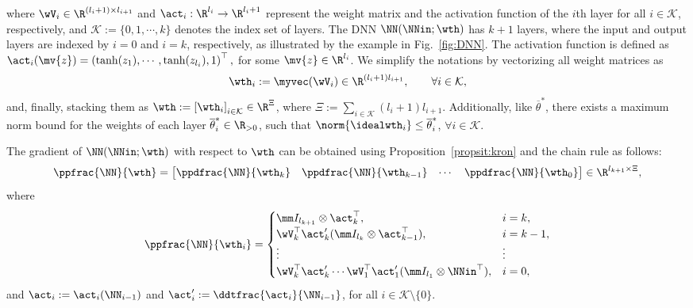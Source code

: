 \documentclass[letterpaper, journal]{IEEEtran}
\begin{document}
where $\wV_i\in\R^{(l_i+1)\times l_{i+1}}$ and $\act_i: \R^{l_i}\to\R^{l_i+1}$ represent the weight matrix and the activation function of the $i$th layer for all $i\in\mathcal{K}$, respectively, and $\mathcal{K}:=\{0,1,\cdots,k\}$ denotes the index set of layers.
The DNN $\NN(\NNin;\wth)$ has $k+1$ layers, where the input and output layers are indexed by $i=0$ and $i=k$, respectively, as illustrated by the example in Fig.~\ref{fig:DNN}.
The activation function is defined as $\act_i(\mv{z}) = \left(\tanh(z_1),\cdots,\tanh(z_{l_i}),1\right)^\top,$ for some $\mv{z}\in\R^{l_i}$.
We simplify the notations by vectorizing all weight matrices as 
\begin{equation*}
  \wth_i 
  :=
  \myvec(\wV_i)
  \in\R^{(l_i+1)l_{i+1}}
  ,
  \qquad
  \forall 
  i\in\mathcal{K}
  ,
\end{equation*}
and, finally, stacking them as $\wth := \left[\wth_i\right]_{i\in\mathcal{K}}\in\R^\Xi$, where $\Xi := \sum_{i\in\mathcal{K}} (l_i+1)l_{i+1}$.
Additionally, like $\overline{\theta}^*$, there exists a maximum norm bound for the weights of each layer $\overline{\theta}^*_i\in\R_{>0}$, such that $\norm{\idealwth_i}\le\overline{\theta}^*_i$, $\forall i\in\mathcal{K}$.

The gradient of $ \NN(\NNin;\wth)$ with respect to $\wth$ can be obtained using Proposition~\ref{propsit:kron} and the chain rule as follows:
\begin{equation}
  \ppfrac{\NN}{\wth}=
  \begin{bmatrix}
    \ppdfrac{\NN}{\wth_k}&
    \ppdfrac{\NN}{\wth_{k-1}}&
\cdots &
    \ppdfrac{\NN}{\wth_0}
  \end{bmatrix}
  \in\R^{l_{k+1} \times \Xi}
  ,
  \label{eq:gradient:phi}
\end{equation}
where
\begin{equation}
  \ppfrac{\NN}{\wth_i} = 
  \begin{cases}
      \mm I_{l_{k+1}}
      \otimes 
      \act_{k}^\top  
    , 
    &
    i=k
    ,
    \\
    \wV_k^\top\act_{k}' 
    (
      \mm I_{l_{k}}
      \otimes  
      \act_{k-1}^\top  
    )
    , 
    & 
    i=k-1
    ,
    \\
    \vdots 
    &
    \vdots 
    \\
    \wV_k^\top\act'_{k} 
    \cdots 
    \wV_1^\top\act_1' 
    (
      \mm I_{l_1}
      \otimes 
      \NNin^\top  
    )
    , 
    &
    i = 0
    ,
  \end{cases}
  \label{eq:NN:grad}
\end{equation}
and $\act_i:= \act_i(\NN_{i-1})$ and $\act_i':= \ddtfrac{\act_i}{\NN_{i-1}}$, for all $i\in\mathcal{K}\setminus\{0\}$.
\end{document}
